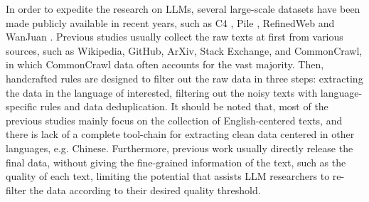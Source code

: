 \documentclass{article}
\begin{document}
 
In order to expedite the research on LLMs, several large-scale datasets have been made publicly available in recent years, such as C4 \cite{2020T5C4}, Pile \cite{2020_pile}, RefinedWeb \cite{2023refinedweb} and WanJuan \cite{2023wanjuan}. Previous studies usually collect the raw texts at first from various sources, such as Wikipedia, GitHub, ArXiv, Stack Exchange, and CommonCrawl, in which CommonCrawl data often accounts for the vast majority. Then, handcrafted rules are designed to filter out the raw data in three steps: extracting the data in the language of interested, filtering out the noisy texts with language-specific rules and data deduplication. It should be noted that, most of the previous studies mainly focus on the collection of English-centered texts, and there is lack of a complete tool-chain for extracting clean data centered in other languages, e.g. Chinese. Furthermore, previous work usually directly release the final data, without giving the fine-grained information of the text, such as the quality of each text, limiting the potential that assists LLM researchers to re-filter the data according to their desired quality threshold.

\end{document}
